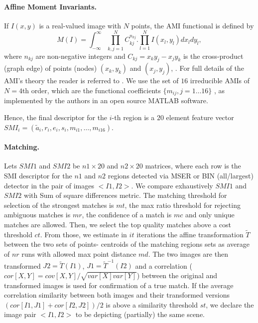 \documentclass[a4paper,11pt]{article}
\begin{document}
\paragraph{Affine Moment Invariants.}
 
If $I(x,y)$ is a real-valued image with $N$ points, the AMI functional is defined by
\begin{equation*}
M(I) = \int_{-\infty}^{\infty} \prod_{k,j=1}^{N}C_{kj}^{n_{kj}} . \prod_{l=1}^{N}I(x_l, y_l)dx_ldy_l,
\end{equation*}
where $n_{kj}$ are non-negative integers and $C_{kj} =x_ky_j - x_jy_k$ is the cross-product (graph edge) of points (nodes) $(x_k, y_k)$ and $(x_j, y_j)$, \cite{SukF04}. For full details of the AMI's theory the reader is referred to \cite{Flusser09a}.
We use the set of $16$  irreducible AMIs of $N=4$th order, which are the functional coefficients $\{m_{ij},j=1 \ldots 16 \}$ , as implemented by the authors in an open source MATLAB software.%

Hence, the final descriptor for the $i$-th region is a $20$ element feature vector $SMI_i = (\tilde{a}_i, r_i, e_i, s_i, m_{i1}, \ldots, m_{i16})$. 

\paragraph{Matching.}

Lets $\mathit{SMI}1$ and $\mathit{SMI}2$ be $\mathit{n1} \times 20$ and $\mathit{n2} \times 20$ matrices, where each row is the SMI descriptor for the $n1$ and $n2$ regions detected via MSER or BIN (all/largest) detector in the pair of images $<I1, I2>$.
We compare exhaustively  $\mathit{SMI}1$ and $\mathit{SMI}2$ with Sum of square differences metric. The matching threshold for selection of the strongest matches is $\mathit{mt}$, the max ratio threshold for rejecting ambiguous matches is $\mathit{mr}$, the confidence of a match is $\mathit{mc}$ and only unique matches are allowed. Then, we select the top quality matches above a cost threshold $\mathit{ct}$. From those, we estimate in $\mathit{it}$ iterations the affine transformation ${\tilde T}$ between the two sets of points- centroids of the matching regions sets as average of $\mathit{nr}$ runs with allowed max point distance $\mathit{md}$. The two images are then transformed $J2 = {\tilde T}(I1)$, $J1 = {\tilde T}^{-1}(I2)$ and a correlation ($cor[X,Y] = cov[X,Y]/ \sqrt{var[X] var[Y]}$) between the original and transformed images is used for confirmation of a true match. If the average correlation similarity between both images and their transformed versions $(cor[I1, J1]+cor[I2, J2])/2$ is above a similarity threshold $st$, we declare the image pair $<I1, I2>$ to be depicting (partially) the same scene.
\end{document}
